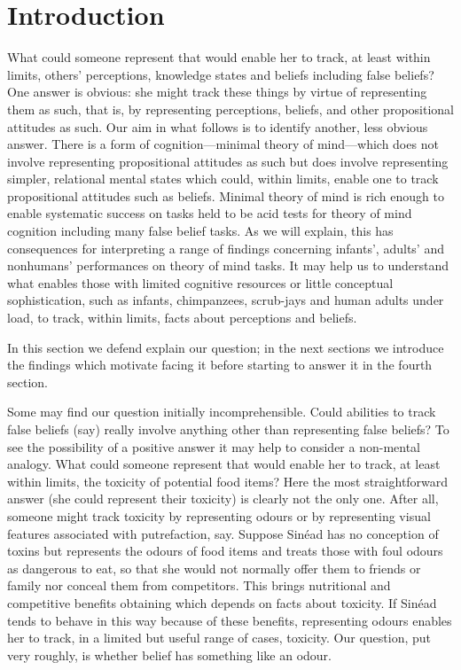 \documentclass[12pt,\papersize]{extarticle}
\begin{document}
\section{Introduction}
What could someone represent that would enable her to track, at least within limits, others' perceptions, knowledge states and beliefs including false beliefs? 
One answer is obvious: she might track these things by virtue of representing them as such, that is, by representing perceptions, beliefs, and other propositional attitudes as such.
Our aim in what follows is to identify another, less obvious answer.
There is a form of cognition---minimal theory of mind---which does not involve representing propositional attitudes as such but does involve representing simpler, relational mental states which could, within limits, enable one to track propositional attitudes such as beliefs.
Minimal theory of mind 
is  rich enough to enable systematic success on tasks held to be acid tests for theory of mind cognition including many false belief tasks.
As we will explain, this has consequences 
for interpreting a range of findings concerning infants', adults' and nonhumans' performances on theory of mind tasks.
It may help us to understand what enables those with limited cognitive resources or little conceptual sophistication, such as infants, chimpanzees, scrub-jays and human adults under load, to track, within limits, facts about perceptions and beliefs.

In this section we defend explain our question; in the next sections we introduce the findings which motivate facing it before starting to answer it in the fourth section.

Some may find our question initially incomprehensible.
Could abilities to track false beliefs (say) really involve anything other than representing false beliefs?
To see the possibility of a positive answer it may help to consider a non-mental analogy.
What could someone represent that would enable her to track, at least within limits, the toxicity of potential food items?
Here the most straightforward answer (she could represent their toxicity) is clearly not the only one.
After all, someone might track toxicity by representing odours or by representing visual features associated with putrefaction, say.
Suppose Sin\'ead has no conception of toxins but represents the odours of food items and 
treats those with foul odours as dangerous to eat,
so that she would not normally offer them to friends or family
nor conceal them from competitors.
This brings nutritional and competitive benefits obtaining which depends on facts about toxicity.
If Sin\'ead tends to behave in this way because of these benefits, 
representing odours enables her to track, in a limited but useful range of cases,  toxicity.
Our question, put very roughly, is whether   belief has something like an odour.
\end{document}
